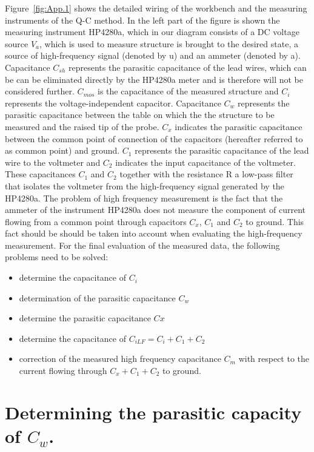 \par Figure~\ref{fig:App.1} shows the detailed wiring of the workbench
and the measuring instruments of the Q-C method. In the left part of
the figure is shown the measuring instrument HP4280a, which in our
diagram consists of a DC voltage source $V_a$, which is used to
measure structure is brought to the desired state, a source of
high-frequency signal (denoted by u) and an ammeter (denoted by a).
Capacitance $C_{sh}$ represents the parasitic capacitance of the lead
wires, which can be can be eliminated directly by the HP4280a meter
and is therefore will not be considered further. $C_{mos}$ is the
capacitance of the measured structure and $C_i$ represents the
voltage-independent capacitor. Capacitance $C_w$ represents the
parasitic capacitance between the table on which the the structure to
be measured and the raised tip of the probe. $C_x$ indicates the
parasitic capacitance between the common point of connection of the
capacitors (hereafter referred to as common point) and ground. $C_1$
represents the parasitic capacitance of the lead wire to the voltmeter
and $C_2$ indicates the input capacitance of the voltmeter.  These
capacitances $C_1$ and $C_2$ together with the resistance R a low-pass
filter that isolates the voltmeter from the high-frequency signal
generated by the HP4280a. The problem of high frequency measurement is
the fact that the ammeter of the instrument HP4280a does not measure
the component of current flowing from a common point through
capacitors $C_x$, $C_1$ and $C_2$ to ground. This fact should be
should be taken into account when evaluating the high-frequency
measurement. For the final evaluation of the measured data, the
following problems need to be solved:

\begin{itemize}
\item determine the capacitance of $C_i$
\item determination of the parasitic capacitance $C_w$
\item determine the parasitic capacitance $Cx$
\item determine the capacitance of $C_{iLF}  = C_i + C_1 + C_2$
\item correction of the measured high frequency capacitance $C_m$ with respect to
  the current flowing through $C_x + C_1 + C_2$ to ground.
\end{itemize}


\section{Determining the parasitic capacity of $C_w$.}\label{sec:E.1}


